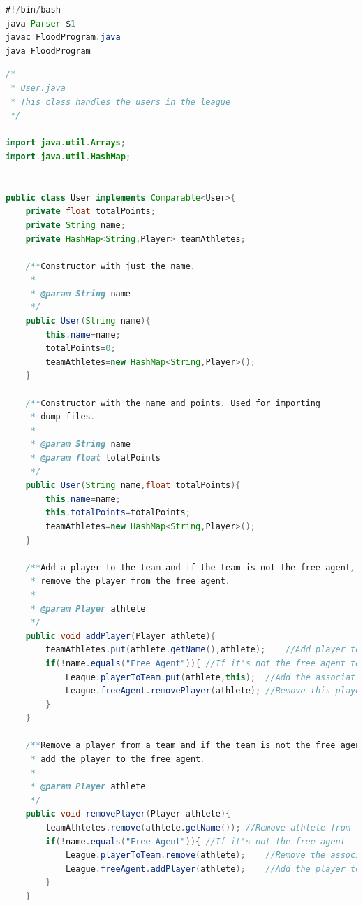 \documentclass[12pt]{report}
\begin{document}
\begin{singlespace}
\begin{lstlisting}[language=Java,label=some-code,caption={run.sh}]
#!/bin/bash
java Parser $1
javac FloodProgram.java
java FloodProgram
\end{lstlisting}
\end{singlespace}

\begin{singlespace}
\begin{lstlisting}[language=Java,label=some-code,caption={User.java}]
/*
 * User.java
 * This class handles the users in the league
 */

import java.util.Arrays;
import java.util.HashMap;


public class User implements Comparable<User>{
    private float totalPoints;
    private String name;
    private HashMap<String,Player> teamAthletes;
    
    /**Constructor with just the name.
     * 
     * @param String name
     */
    public User(String name){
    	this.name=name;
    	totalPoints=0;
    	teamAthletes=new HashMap<String,Player>();
    }
    
    /**Constructor with the name and points. Used for importing
     * dump files.
     * 
     * @param String name
     * @param float totalPoints
     */
    public User(String name,float totalPoints){
    	this.name=name;
    	this.totalPoints=totalPoints;
    	teamAthletes=new HashMap<String,Player>();
    }
    
    /**Add a player to the team and if the team is not the free agent,
     * remove the player from the free agent.
     * 
     * @param Player athlete
     */
    public void addPlayer(Player athlete){
    	teamAthletes.put(athlete.getName(),athlete);	//Add player to this team
    	if(!name.equals("Free Agent")){	//If it's not the free agent team
    		League.playerToTeam.put(athlete,this);	//Add the association of player to team mapping
    		League.freeAgent.removePlayer(athlete);	//Remove this player from the free agent
    	}
    }
    
    /**Remove a player from a team and if the team is not the free agent,
     * add the player to the free agent.
     * 
     * @param Player athlete
     */
    public void removePlayer(Player athlete){
    	teamAthletes.remove(athlete.getName());	//Remove athlete from this team
    	if(!name.equals("Free Agent")){	//If it's not the free agent
    		League.playerToTeam.remove(athlete);	//Remove the association of player to team
    		League.freeAgent.addPlayer(athlete);	//Add the player to the free agent
    	}
    }
    

\end{lstlisting}
\end{singlespace}
\end{document}
